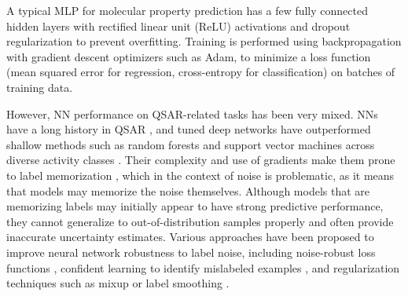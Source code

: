 A typical MLP for molecular property prediction has a few fully connected hidden layers with rectified linear unit (ReLU) activations and dropout regularization to prevent overfitting. Training is performed using backpropagation with gradient descent optimizers such as Adam, to minimize a loss function (mean squared error for regression, cross-entropy for classification) on batches of training data. 

However, NN performance on QSAR-related tasks has been very mixed. NNs have a long history in QSAR \citep{Baskin2008}, and tuned deep networks have outperformed shallow methods such as random forests and support vector machines across diverse activity classes \citep{Koutsoukas2017}. Their complexity and use of gradients make them prone to label memorization \citep{Zhang2017}, which in the context of noise is problematic, as it means that models may memorize the noise themselves. Although models that are memorizing labels may initially appear to have strong predictive performance, they cannot generalize to out-of-distribution samples properly and often provide inaccurate uncertainty estimates. Various approaches have been proposed to improve neural network robustness to label noise, including noise-robust loss functions \citep{Song2022}, confident learning to identify mislabeled examples \citep{Northcutt2021}, and regularization techniques such as mixup \citep{Zhang2018mixup} or label smoothing \citep{Szegedy2015}. 

